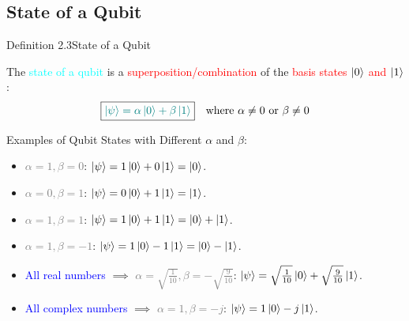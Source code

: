 \documentclass{book}
\begin{document}
\subsection{State of a Qubit}
\begin{defBox}{Definition 2.3}{State of a Qubit}
    \raggedright
    The \textcolor{cyan}{state of a qubit} is a \textcolor{red}{superposition/combination} of the \textcolor{red}{basis states \(\ket{0}\) and \(\ket{1}\)}:
    \[
    \boxed{\textcolor{teal}{\ket{\psi} = \alpha \ket{0} + \beta \ket{1}}} \quad \text{where } \alpha \neq 0 \text{ or } \beta \neq 0
    \]
\end{defBox}
Examples of Qubit States with Different \(\alpha\) and \(\beta\):
\begin{itemize}
    \item \textcolor{gray}{\(\alpha = 1, \beta = 0\)}: \textcolor{forestgreen}{\(\ket{\psi} = 1 \ket{0} + 0 \ket{1} = \ket{0}\)}.
    \item \textcolor{gray}{\(\alpha = 0, \beta = 1\)}: \textcolor{forestgreen}{\(\ket{\psi} = 0 \ket{0} + 1 \ket{1} = \ket{1}\)}.
    \item \textcolor{gray}{\(\alpha = 1, \beta = 1\)}: \textcolor{forestgreen}{\(\ket{\psi} = 1 \ket{0} + 1 \ket{1} = \ket{0} + \ket{1}\)}.
    \item \textcolor{gray}{\(\alpha = 1, \beta = -1\)}: \textcolor{forestgreen}{\(\ket{\psi} = 1 \ket{0} - 1 \ket{1} = \ket{0} - \ket{1}\)}.
    \item \textcolor{blue}{All real numbers} $\implies$ \textcolor{gray}{\(\alpha = \sqrt{\frac{1}{10}}, \beta = -\sqrt{\frac{9}{10}}\)}: \textcolor{forestgreen}{\(\ket{\psi} = \sqrt{\frac{1}{10}} \ket{0} + \sqrt{\frac{9}{10}} \ket{1}\)}.
    \item \textcolor{blue}{All complex numbers} $\implies$ \textcolor{gray}{\(\alpha = 1, \beta = -j\)}: \textcolor{forestgreen}{\(\ket{\psi} = 1 \ket{0} - j \ket{1}\)}.
\end{itemize}
\end{document}
